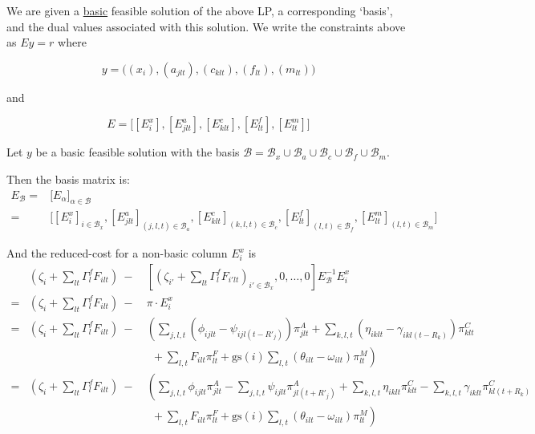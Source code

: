 We are given a \underline{basic} feasible solution of the above LP, a corresponding `basis', and the dual values associated with this solution. We write the constraints above as $Ey = r$ where 

\begin{equation*}
y=\Big((x_i),(a_{jlt}),(c_{klt}),(f_{lt}),(m_{lt})\Big)%
\end{equation*}

and 

\begin{equation*}
E = \Big[[E^{x}_{i}],[E^{a}_{jlt}],[E^{c}_{klt}],[E^{f}_{lt}],[E^{m}_{lt}]\Big]%
\end{equation*}

Let $y$ be a basic feasible solution with the basis $\mathcal{B} = \mathcal{B}_x \cup \mathcal{B}_a \cup \mathcal{B}_c \cup \mathcal{B}_f \cup \mathcal{B}_m$. %

Then the basis matrix is:
\begin{align*}
E_{\mathcal{B}} = & \Big[E_{\alpha}\Big]_{\alpha \in \mathcal{B}}\\
				= & \Big[[E^{x}_{i}]_{i \in \mathcal{B}_x},[E^{a}_{jlt}]_{{(j,l,t)} \in \mathcal{B}_a},[E^{c}_{klt}]_{{(k,l,t)} \in \mathcal{B}_c},[E^{f}_{lt}]_{{(l,t)} \in \mathcal{B}_f},[E^{m}_{lt}]_{{(l,t)} \in \mathcal{B}_m}\Big]%
\end{align*}

And the reduced-cost for a non-basic column $E^x_i$ is 
\begin{align*}
& \left(\zeta_i + \sum_{lt} \Gamma^f_l F_{ilt}\right) ~-~ & \left[\left(\zeta_{i'} + \sum_{lt} \Gamma^f_l F_{i'lt}\right)_{i' \in \mathcal{B}_x}, 0, \dots, 0\right] E_{\mathcal{B}}^{-1} E^{x}_{i}\\
= & \left(\zeta_i + \sum_{lt} \Gamma^f_l F_{ilt}\right) ~-~ & \pi \cdot E^{x}_{i}\\
= & \left(\zeta_i + \sum_{lt} \Gamma^f_l F_{ilt}\right) ~-~ & \left(\sum_{j,l,t} (\phi_{ijlt} - \psi_{ijl(t-R'_j)})\pi^{A}_{jlt} + \sum_{k,l,t} (\eta_{iklt} - \gamma_{ikl(t-R_k)})\pi^{C}_{klt}\right.\\
 & & \ \ + \left.\sum_{l,t} F_{ilt}\pi^{F}_{lt} + \textrm{gs}(i) \sum_{l,t} (\theta_{ilt} - \omega_{ilt})\pi^{M}_{lt}\right)\\%
= & \left(\zeta_i + \sum_{lt} \Gamma^f_l F_{ilt}\right) ~-~ & \left(\sum_{j,l,t} \phi_{ijlt}\pi^{A}_{jlt} - \sum_{j,l,t}\psi_{ijlt}\pi^{A}_{jl(t+R'_j)} + \sum_{k,l,t} \eta_{iklt}\pi^{C}_{klt} - \sum_{k,l,t}\gamma_{iklt}\pi^{C}_{kl(t+R_k)}\right.\\
 & & \ \ + \left.\sum_{l,t} F_{ilt}\pi^{F}_{lt} + \textrm{gs}(i) \sum_{l,t} (\theta_{ilt} - \omega_{ilt})\pi^{M}_{lt}\right)%
\end{align*}

